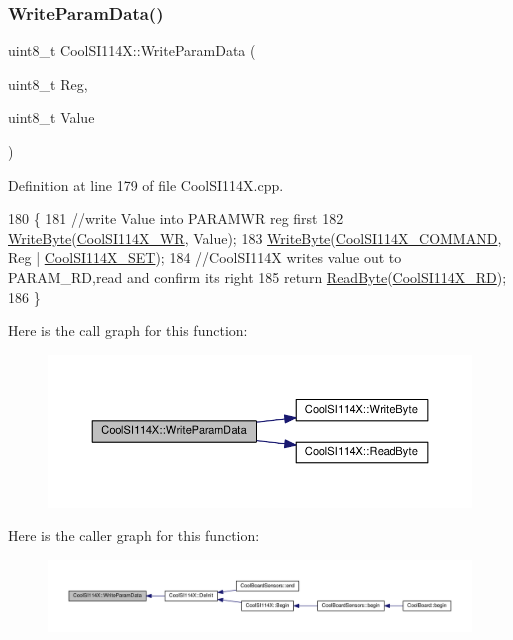 \subsubsection{\texorpdfstring{Write\+Param\+Data()}{WriteParamData()}}
{\footnotesize\ttfamily uint8\+\_\+t Cool\+S\+I114\+X\+::\+Write\+Param\+Data (\begin{DoxyParamCaption}\item[{uint8\+\_\+t}]{Reg,  }\item[{uint8\+\_\+t}]{Value }\end{DoxyParamCaption})}



Definition at line 179 of file Cool\+S\+I114\+X.\+cpp.


\begin{DoxyCode}
180 \{
181     \textcolor{comment}{//write Value into PARAMWR reg first}
182    \hyperlink{class_cool_s_i114_x_ac5c8dc5ade604da7a1c8cd1586feefc2}{WriteByte}(\hyperlink{_cool_s_i114_x_8h_a4a9fa9db26d9563d0180e208941e2d92}{CoolSI114X\_WR}, Value);
183    \hyperlink{class_cool_s_i114_x_ac5c8dc5ade604da7a1c8cd1586feefc2}{WriteByte}(\hyperlink{_cool_s_i114_x_8h_af443805ce1c198eff43fb1b840c45500}{CoolSI114X\_COMMAND}, Reg | \hyperlink{_cool_s_i114_x_8h_aad68b2256736245182fd0075801e4e0e}{CoolSI114X\_SET});
184    \textcolor{comment}{//CoolSI114X writes value out to PARAM\_RD,read and confirm its right}
185    \textcolor{keywordflow}{return} \hyperlink{class_cool_s_i114_x_acc20f8037e156ec4aadcbe90780b1e8b}{ReadByte}(\hyperlink{_cool_s_i114_x_8h_af0cd5425a0d2f2993040d97d4df30c85}{CoolSI114X\_RD});
186 \}
\end{DoxyCode}
Here is the call graph for this function\+:\nopagebreak
\begin{figure}[H]
\begin{center}
\leavevmode
\includegraphics[width=350pt]{dd/d67/class_cool_s_i114_x_abf45eb10a6de1be16e68a51624fa2608_cgraph}
\end{center}
\end{figure}
Here is the caller graph for this function\+:\nopagebreak
\begin{figure}[H]
\begin{center}
\leavevmode
\includegraphics[width=350pt]{dd/d67/class_cool_s_i114_x_abf45eb10a6de1be16e68a51624fa2608_icgraph}
\end{center}
\end{figure}


